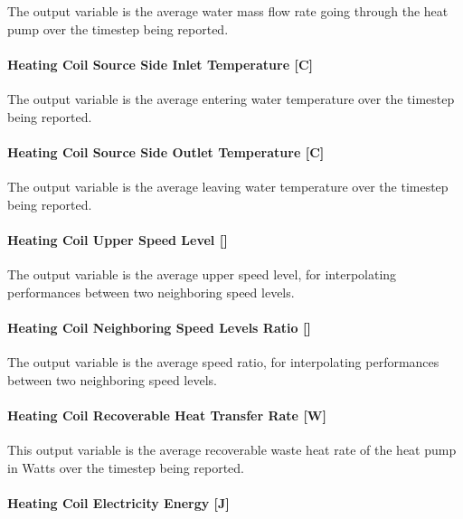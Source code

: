 The output variable is the average water mass flow rate going through the heat pump over the timestep being reported.

\paragraph{Heating Coil Source Side Inlet Temperature {[}C{]}}\label{heating-coil-source-side-inlet-temperature-c-1}

The output variable is the average entering water temperature over the timestep being reported.

\paragraph{Heating Coil Source Side Outlet Temperature {[}C{]}}\label{heating-coil-source-side-outlet-temperature-c-1}

The output variable is the average leaving water temperature over the timestep being reported.

\paragraph{Heating Coil Upper Speed Level {[]}}\label{heating-coil-upper-speed-level-1}

The output variable is the average upper speed level, for interpolating performances between two neighboring speed levels.

\paragraph{Heating Coil Neighboring Speed Levels Ratio {[]}}\label{heating-coil-neighboring-speed-levels-ratio-1}

The output variable is the average speed ratio, for interpolating performances between two neighboring speed levels.

\paragraph{Heating Coil Recoverable Heat Transfer Rate {[}W{]}}\label{heating-coil-recoverable-heat-transfer-rate-w}

This output variable is the average recoverable waste heat rate of the heat pump in Watts over the timestep being reported.

\paragraph{Heating Coil Electricity Energy {[}J{]}}\label{heating-coil-electric-energy-j-6}

